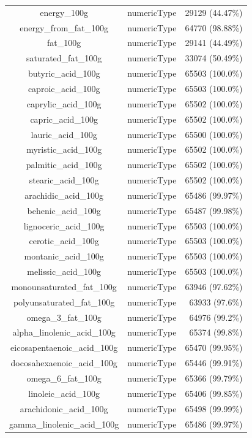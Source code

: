 \documentclass[11pt]{article}
\begin{document}
\begin{center}
\begin{longtable}{|c|c|r|}
energy\_100g& numericType& 29129 (44.47\%)\\
energy\_from\_fat\_100g& numericType& 64770 (98.88\%)\\
fat\_100g& numericType& 29141 (44.49\%)\\
saturated\_fat\_100g& numericType& 33074 (50.49\%)\\
butyric\_acid\_100g& numericType& 65503 (100.0\%)\\
caproic\_acid\_100g& numericType& 65503 (100.0\%)\\
caprylic\_acid\_100g& numericType& 65502 (100.0\%)\\
capric\_acid\_100g& numericType& 65502 (100.0\%)\\
lauric\_acid\_100g& numericType& 65500 (100.0\%)\\
myristic\_acid\_100g& numericType& 65502 (100.0\%)\\
palmitic\_acid\_100g& numericType& 65502 (100.0\%)\\
stearic\_acid\_100g& numericType& 65502 (100.0\%)\\
arachidic\_acid\_100g& numericType& 65486 (99.97\%)\\
behenic\_acid\_100g& numericType& 65487 (99.98\%)\\
lignoceric\_acid\_100g& numericType& 65503 (100.0\%)\\
cerotic\_acid\_100g& numericType& 65503 (100.0\%)\\
montanic\_acid\_100g& numericType& 65503 (100.0\%)\\
melissic\_acid\_100g& numericType& 65503 (100.0\%)\\
monounsaturated\_fat\_100g& numericType& 63946 (97.62\%)\\
polyunsaturated\_fat\_100g& numericType& 63933 (97.6\%)\\
omega\_3\_fat\_100g& numericType& 64976 (99.2\%)\\
alpha\_linolenic\_acid\_100g& numericType& 65374 (99.8\%)\\
eicosapentaenoic\_acid\_100g& numericType& 65470 (99.95\%)\\
docosahexaenoic\_acid\_100g& numericType& 65446 (99.91\%)\\
omega\_6\_fat\_100g& numericType& 65366 (99.79\%)\\
linoleic\_acid\_100g& numericType& 65406 (99.85\%)\\
arachidonic\_acid\_100g& numericType& 65498 (99.99\%)\\
gamma\_linolenic\_acid\_100g& numericType& 65486 (99.97\%)\\

\end{longtable}
\end{center}
\end{document}
